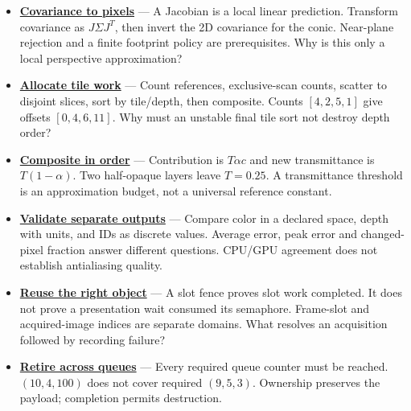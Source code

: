 \begin{itemize}
\item
  \textbf{\href{University\%20-\%20Worlds,\%20Images\%20and\%20Inference\%20-\%20Graphics,\%20Vision\%20and\%20Photography\#Local\%20projection\%20turns\%20an\%20ellipsoid\%20into\%20a\%20screen\%20ellipse}{Covariance to pixels}} --- A Jacobian is a local linear prediction. Transform covariance as \(J\Sigma J^T\), then invert the 2D covariance for the conic. Near-plane rejection and a finite footprint policy are prerequisites. Why is this only a local perspective approximation?
\item
  \textbf{\href{University\%20-\%20Worlds,\%20Images\%20and\%20Inference\%20-\%20Graphics,\%20Vision\%20and\%20Photography\#From\%20ellipses\%20to\%20bounded\%20tile\%20work}{Allocate tile work}} --- Count references, exclusive-scan counts, scatter to disjoint slices, sort by tile/depth, then composite. Counts \([4,2,5,1]\) give offsets \([0,4,6,11]\). Why must an unstable final tile sort not destroy depth order?
\item
  \textbf{\href{University\%20-\%20Worlds,\%20Images\%20and\%20Inference\%20-\%20Graphics,\%20Vision\%20and\%20Photography\#Figure\%20ER1\%20-\%20Footprint,\%20compositing\%20order\%20and\%20storage\%20lifetime}{Composite in order}} --- Contribution is \(T\alpha c\) and new transmittance is \(T(1-\alpha)\). Two half-opaque layers leave \(T=0.25\). A transmittance threshold is an approximation budget, not a universal reference constant.
\item
  \textbf{\href{University\%20-\%20Worlds,\%20Images\%20and\%20Inference\%20-\%20Graphics,\%20Vision\%20and\%20Photography\#Validation\%20should\%20isolate\%20representations\%20before\%20images}{Validate separate outputs}} --- Compare color in a declared space, depth with units, and IDs as discrete values. Average error, peak error and changed-pixel fraction answer different questions. CPU/GPU agreement does not establish antialiasing quality.
\item
  \textbf{\href{Computing\%20Foundations\%20-\%20From\%20Bits\%20to\%20C++\%20and\%20Systems\%20APIs\#Follow\%20a\%20frame\%20slot\%20and\%20a\%20presentation\%20image\%20separately}{Reuse the right object}} --- A slot fence proves slot work completed. It does not prove a presentation wait consumed its semaphore. Frame-slot and acquired-image indices are separate domains. What resolves an acquisition followed by recording failure?
\item
  \textbf{\href{Computing\%20Foundations\%20-\%20From\%20Bits\%20to\%20C++\%20and\%20Systems\%20APIs\#Retire\%20a\%20resource\%20after\%20every\%20user,\%20not\%20after\%20one\%20convenient\%20clock}{Retire across queues}} --- Every required queue counter must be reached. \((10,4,100)\) does not cover required \((9,5,3)\). Ownership preserves the payload; completion permits destruction.

\end{itemize}
